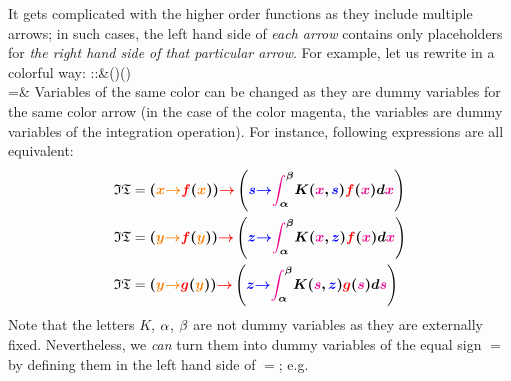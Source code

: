 {	It gets complicated with the higher order functions as they include multiple arrows; in such cases, the left hand side of \emph{each arrow} contains only placeholders for \emph{the right hand side of that particular arrow}. For example, let us rewrite  in a colorful way:
	\bea
	::{}&(\C\to\C)\to (\C\to\C)\\
	={}&
	\eea  
	Variables of the same color can be changed as they are dummy variables for the same color arrow (in the case of the color magenta, the variables are dummy variables of the integration operation). For instance, following expressions are all equivalent:
	\begin{equation*}
		\begin{aligned}
			\mathfrak{IT}={}&\bm{(\textcolor{orange}{x}\textcolor{orange}{\to} \textcolor{red}{f}(\textcolor{orange}{x}))\textcolor{red}{\to}\left(\textcolor{blue}{s}\textcolor{blue}{\to}\textcolor{magenta}{\int_{\textcolor{black}{\alpha}}^{\textcolor{black}{\beta}}} K(\textcolor{magenta}{x},\textcolor{blue}{s})\textcolor{red}{f}(\textcolor{magenta}{x})d\textcolor{magenta}{x}\right)}
			\\
			\mathfrak{IT}={}&\bm{(\textcolor{orange}{y}\textcolor{orange}{\to} \textcolor{red}{f}(\textcolor{orange}{y}))\textcolor{red}{\to}\left(\textcolor{blue}{z}\textcolor{blue}{\to}\textcolor{magenta}{\int_{\textcolor{black}{\alpha}}^{\textcolor{black}{\beta}}} K(\textcolor{magenta}{x},\textcolor{blue}{z})\textcolor{red}{f}(\textcolor{magenta}{x})d\textcolor{magenta}{x}\right)}
			\\
			\mathfrak{IT}={}&\bm{(\textcolor{orange}{y}\textcolor{orange}{\to} \textcolor{red}{g}(\textcolor{orange}{y}))\textcolor{red}{\to}\left(\textcolor{blue}{z}\textcolor{blue}{\to}\textcolor{magenta}{\int_{\textcolor{black}{\alpha}}^{\textcolor{black}{\beta}}} K(\textcolor{magenta}{s},\textcolor{blue}{z})\textcolor{red}{g}(\textcolor{magenta}{s})d\textcolor{magenta}{s}\right)}
		\end{aligned}
	\end{equation*}
	Note that the letters $K$, $\alpha$, $\beta$ are not dummy variables as they are externally fixed. Nevertheless, we \emph{can} turn them into dummy variables of the equal sign $=$ by defining them in the left hand side of $=$; e.g.
}
